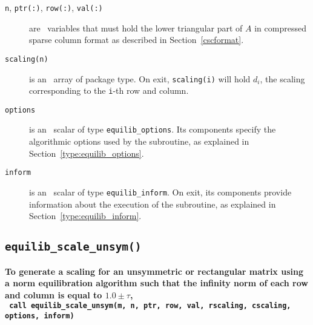 \begin{description}

\item[\texttt{n}, \texttt{ptr(:)}, \texttt{row(:)}, \texttt{val(:)}] are \intentin\ variables that must hold the lower triangular part of $A$ in compressed sparse column format as described in Section~\ref{cscformat}.

\item[\texttt{scaling(n)}] is an \intentout\ array of package type. On exit,
\texttt{scaling(i)} will hold $d_i$, the scaling corresponding to the
\texttt{i}-th row and column.

\item[\texttt{options}] is an \intentin\ scalar of type \texttt{equilib\_options}. Its components specify the algorithmic options used by the subroutine, as explained in Section~\ref{type:equilib_options}.

\item[\texttt{inform}] is an \intentout\ scalar of type \texttt{equilib\_inform}. On exit, its components provide information about the execution of the subroutine, as explained in Section~\ref{type:equilib_inform}.

\end{description}

\subsection{\texttt{equilib\_scale\_unsym()}}

\textbf{\noindent
   To generate a scaling for an unsymmetric or rectangular matrix using a norm equilibration algorithm such that the infinity norm of each row and column is equal to $1.0\pm\tau$,
   \vspace*{0.3cm} \\
   \texttt{ \hspace*{0.2cm}
      call equilib\_scale\_unsym(m, n, ptr, row, val, rscaling, cscaling, options, inform)
   }
   \vspace{0.3cm}
}

